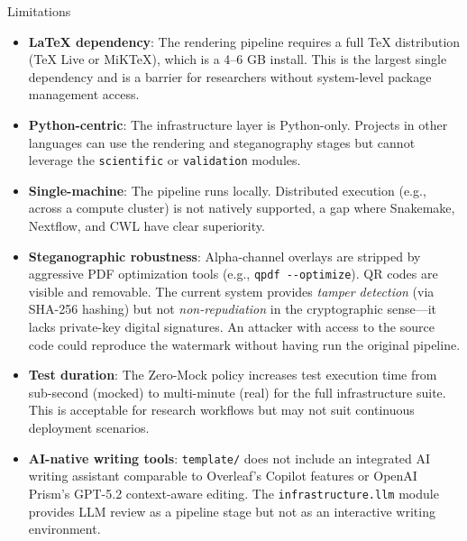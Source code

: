 \documentclass[
  ignorenonframetext,
]{beamer}
\providecommand{\tightlist}{%
  \setlength{\itemsep}{0pt}\setlength{\parskip}{0pt}}
\begin{document}
\begin{frame}[fragile]{Limitations}
\protect{}\label{limitations}
\begin{itemize}
\tightlist
\item
  \textbf{LaTeX dependency}: The rendering pipeline requires a full TeX
  distribution (TeX Live or MiKTeX), which is a 4--6 GB install. This is
  the largest single dependency and is a barrier for researchers without
  system-level package management access.
\item
  \textbf{Python-centric}: The infrastructure layer is Python-only.
  Projects in other languages can use the rendering and steganography
  stages but cannot leverage the \texttt{scientific} or
  \texttt{validation} modules.
\item
  \textbf{Single-machine}: The pipeline runs locally. Distributed
  execution (e.g., across a compute cluster) is not natively supported,
  a gap where Snakemake, Nextflow, and CWL have clear superiority.
\item
  \textbf{Steganographic robustness}: Alpha-channel overlays are
  stripped by aggressive PDF optimization tools (e.g.,
  \texttt{qpdf\ -\/-optimize}). QR codes are visible and removable. The
  current system provides \emph{tamper detection} (via SHA-256 hashing)
  but not \emph{non-repudiation} in the cryptographic sense---it lacks
  private-key digital signatures. An attacker with access to the source
  code could reproduce the watermark without having run the original
  pipeline.
\item
  \textbf{Test duration}: The Zero-Mock policy increases test execution
  time from sub-second (mocked) to multi-minute (real) for the full
  infrastructure suite. This is acceptable for research workflows but
  may not suit continuous deployment scenarios.
\item
  \textbf{AI-native writing tools}: \texttt{template/} does not include
  an integrated AI writing assistant comparable to Overleaf's Copilot
  features or OpenAI Prism's GPT-5.2 context-aware editing. The
  \texttt{infrastructure.llm} module provides LLM review as a pipeline
  stage but not as an interactive writing environment.
\end{itemize}
\end{frame}
\end{document}
